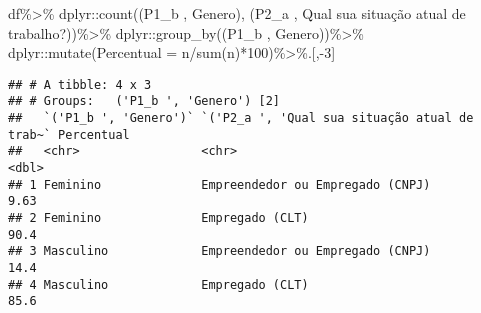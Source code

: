 \documentclass[
]{article}
\newenvironment{Shaded}{\begin{snugshade}}{\end{snugshade}}
\newcommand{\AttributeTok}[1]{\textcolor[rgb]{0.77,0.63,0.00}{#1}}
\newcommand{\DecValTok}[1]{\textcolor[rgb]{0.00,0.00,0.81}{#1}}
\newcommand{\FunctionTok}[1]{\textcolor[rgb]{0.00,0.00,0.00}{#1}}
\newcommand{\NormalTok}[1]{#1}
\newcommand{\SpecialCharTok}[1]{\textcolor[rgb]{0.00,0.00,0.00}{#1}}
\newcommand{\StringTok}[1]{\textcolor[rgb]{0.31,0.60,0.02}{#1}}
\begin{document}
\begin{Shaded}
\begin{Highlighting}[]
\NormalTok{df}\SpecialCharTok{\%\textgreater{}\%}
\NormalTok{  dplyr}\SpecialCharTok{::}\FunctionTok{count}\NormalTok{(}\StringTok{\textasciigrave{}}\AttributeTok{(\textquotesingle{}P1\_b \textquotesingle{}, \textquotesingle{}Genero\textquotesingle{})}\StringTok{\textasciigrave{}}\NormalTok{,}
               \StringTok{\textasciigrave{}}\AttributeTok{(\textquotesingle{}P2\_a \textquotesingle{}, \textquotesingle{}Qual sua situação atual de trabalho?\textquotesingle{})}\StringTok{\textasciigrave{}}\NormalTok{)}\SpecialCharTok{\%\textgreater{}\%}
\NormalTok{  dplyr}\SpecialCharTok{::}\FunctionTok{group\_by}\NormalTok{(}\StringTok{\textasciigrave{}}\AttributeTok{(\textquotesingle{}P1\_b \textquotesingle{}, \textquotesingle{}Genero\textquotesingle{})}\StringTok{\textasciigrave{}}\NormalTok{)}\SpecialCharTok{\%\textgreater{}\%}
\NormalTok{  dplyr}\SpecialCharTok{::}\FunctionTok{mutate}\NormalTok{(}\AttributeTok{Percentual =}\NormalTok{ n}\SpecialCharTok{/}\FunctionTok{sum}\NormalTok{(n)}\SpecialCharTok{*}\DecValTok{100}\NormalTok{)}\SpecialCharTok{\%\textgreater{}\%}\NormalTok{.[,}\SpecialCharTok{{-}}\DecValTok{3}\NormalTok{]}
\end{Highlighting}
\end{Shaded}

\begin{verbatim}
## # A tibble: 4 x 3
## # Groups:   ('P1_b ', 'Genero') [2]
##   `('P1_b ', 'Genero')` `('P2_a ', 'Qual sua situação atual de trab~` Percentual
##   <chr>                 <chr>                                              <dbl>
## 1 Feminino              Empreendedor ou Empregado (CNPJ)                    9.63
## 2 Feminino              Empregado (CLT)                                    90.4 
## 3 Masculino             Empreendedor ou Empregado (CNPJ)                   14.4 
## 4 Masculino             Empregado (CLT)                                    85.6
\end{verbatim}
\end{document}
